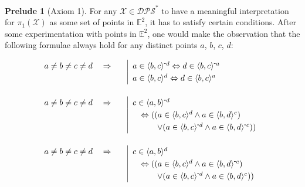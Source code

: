 \documentclass[11pt, oneside]{article}      %
\theoremstyle{definition}
\numberwithin{equation}{section}
\theoremstyle{c}
\newtheorem*{prelude}{Prelude}
\begin{document}
\begin{prelude}[Axiom 1]
For any $\mathscr{X} \in \mathscr{DPS}^*$ to have a meaningful interpretation for $\pi_1(\mathscr{X})$ as some set of points in $\mathbb{E}^2$, it has to satisfy certain conditions. After some experimentation with points in $\mathbb{E}^2$, one would make the observation that the following formulae always hold for any distinct points $a$, $b$, $c$, $d$:

\begin{alignat}{2}
 \label{general_position_law1}
  &a\not=b\not=c\not=d \quad \Rightarrow & \quad & \begin{aligned}[t] \renewcommand\arraystretch{1.25}\begin{array}[t]{|@{\hskip0.6em}l} \color{black}
    a \in \langle b,c \rangle^{\scalebox{0.75}[1.0]{-}d} \Leftrightarrow d \in \langle b,c \rangle^{\scalebox{0.75}[1.0]{-}a} \\
  a \in \langle b,c \rangle^d \Leftrightarrow d \in \langle b,c \rangle^a
  \end{array}
  \end{aligned}\\[2.5ex]
  \label{general_position_law2}
  &a\not=b\not=c\not=d \quad \Rightarrow & \quad & \begin{aligned}[t] \renewcommand\arraystretch{1.25}\begin{array}[t]{|@{\hskip0.6em}l} \color{black}
  c \in \langle a,b \rangle^{\scalebox{0.75}[1.0]{-}d} \\
  \quad  \Leftrightarrow ((a \in \langle b,c \rangle^d \land a \in \langle b,d \rangle^c) \\
  \quad  \qquad \lor (a \in \langle b,c \rangle^{\scalebox{0.75}[1.0]{-}d} \land a \in \langle b,d \rangle^{\scalebox{0.75}[1.0]{-}c}) )
  \end{array}
  \end{aligned}\\[2.5ex]
    \label{general_position_law3}
  &a\not=b\not=c\not=d \quad \Rightarrow & \quad & \begin{aligned}[t] \renewcommand\arraystretch{1.25}\begin{array}[t]{|@{\hskip0.6em}l} \color{black}
  c \in \langle a,b \rangle^{d} \\
  \quad  \Leftrightarrow ((a \in \langle b,c \rangle^d \land a \in \langle b,d \rangle^{\scalebox{0.75}[1.0]{-}c}) \\
  \quad\qquad \lor (a \in \langle b,c \rangle^{\scalebox{0.75}[1.0]{-}d} \land a \in \langle b,d \rangle^{c}) )
  \end{array}
  \end{aligned}\\[2.5ex]

\end{alignat}
\end{prelude}
\end{document}
